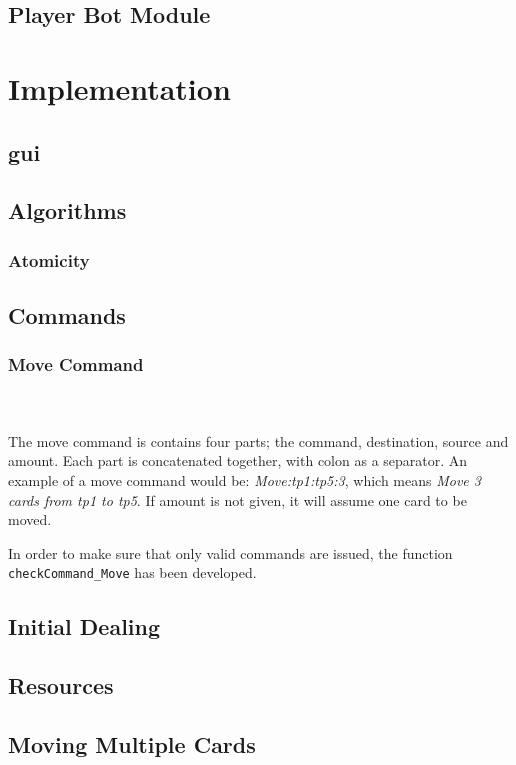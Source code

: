 \documentclass[runningheads,a4paper]{llncs}
\newcommand{\GPenSIM}{../GPenSIM}
\begin{document}
\subsection{Player Bot Module}


\section{Implementation}
\label{sec:3_implementation}
\subsection{\ac{gui}}
\label{sec:3_gui}
\subsection{Algorithms}
\subsubsection{Atomicity}
\subsection{Commands}
\subsubsection{Move Command}~\\~\\
\label{sec:3_move_command}
The move command is contains four parts; the command, destination, source and amount. Each part is concatenated together, with colon as a separator. An example of a move command would be: \textit{Move:\ac{tp}1:\ac{tp}5:3}, which means \textit{Move 3 cards from \ac{tp}1 to \ac{tp}5}. If amount is not given, it will assume one card to be moved.
\newline

In order to make sure that only valid commands are issued, the function \verb!checkCommand_Move! has been developed. 

\subsection{Initial Dealing}
\subsection{Resources}
\label{sec:3_Resources}
\subsection{Moving Multiple Cards}
\end{document}
